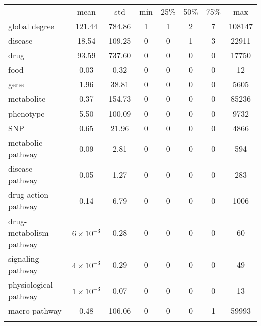 \documentclass{standalone}
\begin{document}
\begin{table}
\centering
\begin{tabular}{lccccccc}
\hline\rowcolor{darkgrayrow}
                        & mean            &  std    &  min & 25\% & 50\% & 75\% &   max  \\
global degree           & 121.44          &  784.86 &    1 &    1 &    2 &    7 & 108147 \\
disease                 &  18.54          &  109.25 &    0 &    0 &    1 &    3 &  22911 \\
drug                    &  93.59          &  737.60 &    0 &    0 &    0 &    0 &  17750 \\
food                    &   0.03          &    0.32 &    0 &    0 &    0 &    0 &     12 \\
gene                    &   1.96          &   38.81 &    0 &    0 &    0 &    0 &   5605 \\
metabolite              &   0.37          &  154.73 &    0 &    0 &    0 &    0 &  85236 \\
phenotype               &   5.50          &  100.09 &    0 &    0 &    0 &    0 &   9732 \\
SNP                     &   0.65          &   21.96 &    0 &    0 &    0 &    0 &   4866 \\
metabolic pathway       &   0.09          &    2.81 &    0 &    0 &    0 &    0 &    594 \\
disease pathway         &   0.05          &    1.27 &    0 &    0 &    0 &    0 &    283 \\
drug-action pathway     &   0.14          &    6.79 &    0 &    0 &    0 &    0 &   1006 \\
drug-metabolism pathway &$6\times10^{-3}$ &    0.28 &    0 &    0 &    0 &    0 &     60 \\
signaling pathway       &$4\times10^{-3}$ &    0.29 &    0 &    0 &    0 &    0 &     49 \\
physiological pathway   &$1\times10^{-3}$ &    0.07 &    0 &    0 &    0 &    0 &     13 \\
macro pathway           &   0.48          &  106.06 &    0 &    0 &    0 &    1 &  59993 \\
\hline\\
\end{tabular}
\caption{%
}
\label{tab:chimera_degree}
\end{table}
\end{document}
